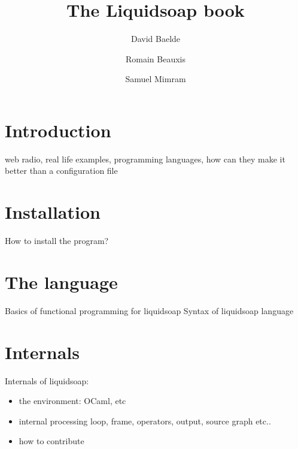 \documentclass[a4paper]{book}
\title{The Liquidsoap book}
\author{David Baelde \and Romain Beauxis \and Samuel Mimram}
\begin{document}
\maketitle

\tableofcontents

\chapter{Introduction}
web radio, real life examples, programming languages, how can they make it
better than a configuration file

\chapter{Installation}
How to install the program?

\chapter{The language}
Basics of functional programming for liquidsoap
Syntax of liquidsoap language

\chapter{Internals}
Internals of liquidsoap:
\begin{itemize}
\item the environment: OCaml, etc
\item internal processing loop, frame, operators, output, source graph etc..
\item how to contribute
\end{itemize}
\end{document}
